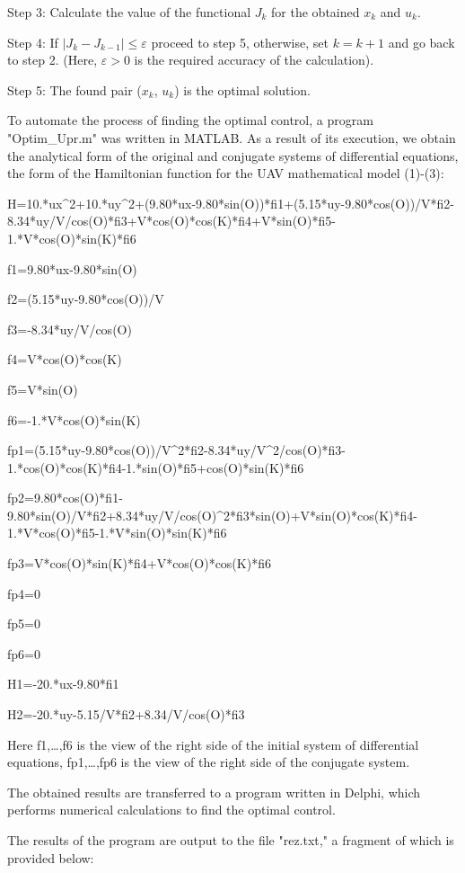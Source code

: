 Step 3: Calculate the value of the functional \(J_{k}\) for the obtained
\(x_{k}\) and \(u_{k}\).

Step 4: If \(\left| J_{k} - J_{k - 1} \right| \leq \varepsilon\) proceed
to step 5, otherwise, set \(k = k + 1\) and go back to step 2. (Here,
\(\varepsilon > 0\) is the required accuracy of the calculation).

Step 5: The found pair (\(x_{k}\), \(u_{k}\)) is the optimal solution.

To automate the process of finding the optimal control, a program
"Optim\_Upr.m" was written in MATLAB. As a result of its execution, we
obtain the analytical form of the original and conjugate systems of
differential equations, the form of the Hamiltonian function for the UAV
mathematical model (1)-(3):

H=10.*ux\^{}2+10.*uy\^{}2+(9.80*ux-9.80*sin(O))*fi1+(5.15*uy-9.80*cos(O))/V*fi2-8.34*uy/V/cos(O)*fi3+V*cos(O)*cos(K)*fi4+V*sin(O)*fi5-1.*V*cos(O)*sin(K)*fi6

f1=9.80*ux-9.80*sin(O)

f2=(5.15*uy-9.80*cos(O))/V

f3=-8.34*uy/V/cos(O)

f4=V*cos(O)*cos(K)

f5=V*sin(O)

f6=-1.*V*cos(O)*sin(K)

fp1=(5.15*uy-9.80*cos(O))/V\^{}2*fi2-8.34*uy/V\^{}2/cos(O)*fi3-1.*cos(O)*cos(K)*fi4-1.*sin(O)*fi5+cos(O)*sin(K)*fi6

fp2=9.80*cos(O)*fi1-9.80*sin(O)/V*fi2+8.34*uy/V/cos(O)\^{}2*fi3*sin(O)+V*sin(O)*cos(K)*fi4-1.*V*cos(O)*fi5-1.*V*sin(O)*sin(K)*fi6

fp3=V*cos(O)*sin(K)*fi4+V*cos(O)*cos(K)*fi6

fp4=0

fp5=0

fp6=0

H1=-20.*ux-9.80*fi1

H2=-20.*uy-5.15/V*fi2+8.34/V/cos(O)*fi3

Here f1,\ldots,f6 is the view of the right side of the initial system of
differential equations, fp1,\ldots,fp6 is the view of the right side of
the conjugate system.

The obtained results are transferred to a program written in Delphi,
which performs numerical calculations to find the optimal control.

The results of the program are output to the file "rez.txt," a fragment
of which is provided below:

